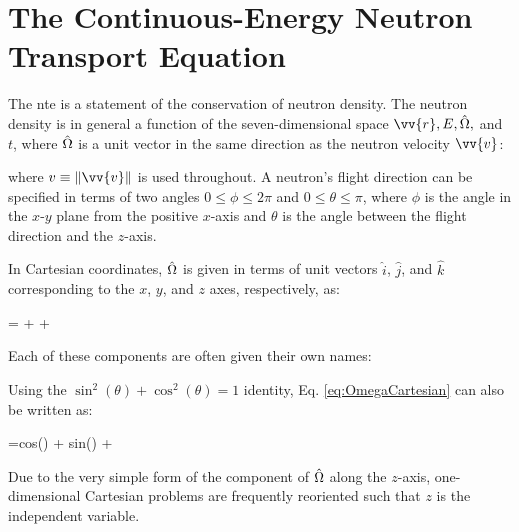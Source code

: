 \section{The Continuous-Energy Neutron Transport Equation}
\label{sec:CE_NTE}

The \gls{nte} is a statement of the conservation of neutron density. The neutron density is in general a function of the seven-dimensional space \(\vv{r}, E, \hO,\) and \(t\), where \(\hat{\Omega}\) is a unit vector in the same direction as the neutron velocity \(\vv{v}\):

\beq
\label{eq:OmegaDef}
\hO\equiv {}
\eeq

where \(v\equiv\|\vv{v}\|\) is used throughout. A neutron's flight direction can be specified in terms of two angles \(0\leq\phi\leq2\pi\) and \(0\leq\theta\leq\pi\), where \(\phi\) is the angle in the \(x\)-\(y\) plane from the positive \(x\)-axis and \(\theta\) is the angle between the flight direction and the \(z\)-axis. 

\begin{tcolorbox}[breakable]
In Cartesian coordinates, \(\hat{\Omega}\) is given in terms of unit vectors \(\hat{i}\), \(\hat{j}\), and \(\hat{k}\) corresponding to the \(x\), \(y\), and \(z\) axes, respectively, as:

\beqa
\label{eq:OmegaCartesian}
\hO  = \sin{(\theta)}\cos{(\phi)} + \sin{(\theta)}\sin{(\phi)} + \cos{(\theta)}\\
\eeqa

Each of these components are often given their own names: 

\beq
\label{eq:xiDef}
 \xi \equiv \sin{(\theta)}\cos{(\phi)}
\eeq

\beq
\label{eq:etaDef}
 \eta \equiv \sin{(\theta)}\sin{(\phi)}
\eeq

\beq
\label{eq:muDef}
 \mu \equiv \cos{(\theta)}
 \eeq
 
 Using the \(\sin^2{(\theta)} + \cos^2{(\theta)} = 1\) identity, Eq. \eqref{eq:OmegaCartesian} can also be written as:
 
\beq
\hO=\textrm{cos}(\phi) + \textrm{sin}(\phi) + \mu{}\\
\eeq
 
Due to the very simple form of the component of \(\hat{\Omega}\) along the \(z\)-axis, one-dimensional Cartesian problems are frequently reoriented such that \(z\) is the independent variable.
 
\end{tcolorbox}

